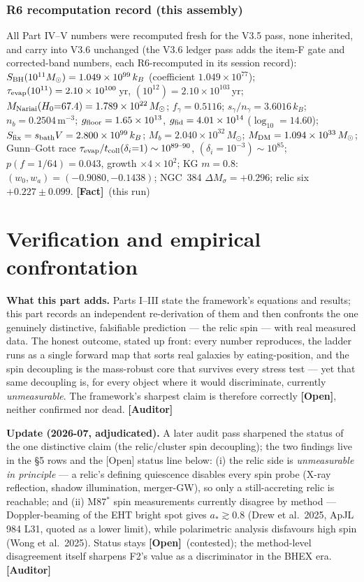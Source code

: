 \documentclass[11pt]{article}
\newcommand{\Fact}{\textbf{\textcolor{green!45!black}{[Fact]}}}
\newcommand{\Open}{\textbf{\textcolor{gray!10!black}{[Open]}}}
\newcommand{\Auditor}{\textbf{\textcolor{teal!55!black}{[Auditor]}}}
\newcommand{\open}{\textcolor{red!70!black}{\textbf{[Open]}}}
\begin{document}
\section{R6 recomputation record (this assembly)}
All Part IV--V numbers were recomputed fresh for the V3.5 pass, none inherited, and carry into V3.6 unchanged (the V3.6 ledger pass adds the item-F gate and corrected-band numbers, each R6-recomputed in its session record): $S_{\rm BH}(10^{11}M_\odot)=1.049\times10^{99}\,k_B$ (coefficient $1.049\times10^{77}$); $\tau_{\rm evap}(10^{11})=2.10\times10^{100}$\,yr, $(10^{12})=2.10\times10^{103}$\,yr; $M_{\rm Nariai}(H_0{=}67.4)=1.789\times10^{22}\,M_\odot$; $f_\gamma=0.5116$; $s_\gamma/n_\gamma=3.6016\,k_B$; $n_b=0.2504$\,m$^{-3}$; $g_{\rm floor}=1.65\times10^{13}$, $g_{\rm fid}=4.01\times10^{14}$ ($\log_{10}=14.60$); $S_{\rm fix}=s_{\rm bath}V=2.800\times10^{99}\,k_B$; $M_b=2.040\times10^{32}\,M_\odot$; $M_{\rm DM}=1.094\times10^{33}\,M_\odot$; Gunn--Gott race $\tau_{\rm evap}/t_{\rm coll}(\delta_i{=}1)\sim10^{89\text{--}90}$, $(\delta_i{=}10^{-3})\sim10^{85}$; $p(f{=}1/64)=0.043$, growth $\times4\times10^{2}$; KG $m{=}0.8$: $(w_0,w_a)=(-0.9080,-0.1438)$; NGC~384 $\Delta M_\sigma=+0.296$; relic six $+0.227\pm0.099$. \Fact\ (this run)

\clearpage

\part{Verification and empirical confrontation}
\setcounter{section}{0}\setcounter{equation}{0}\setcounter{figure}{0}

\noindent\textbf{What this part adds.} Parts I--III state the framework's equations and results; this part records an independent re-derivation of them and then confronts the one genuinely distinctive, falsifiable prediction --- the relic spin --- with real measured data. The honest outcome, stated up front: every number reproduces, the ladder runs as a single forward map that sorts real galaxies by eating-position, and the spin decoupling is the mass-robust core that survives every stress test --- yet that same decoupling is, for every object where it would discriminate, currently \emph{unmeasurable}. The framework's sharpest claim is therefore correctly \Open, neither confirmed nor dead. \Auditor

\noindent\textbf{Update (2026-07, adjudicated).} A later audit pass sharpened the status of the one distinctive claim (the relic/cluster spin decoupling); the two findings live in the \S5 rows and the [Open] status line below: (i) the relic side is \emph{unmeasurable in principle} --- a relic's defining quiescence disables every spin probe (X-ray reflection, shadow illumination, merger-GW), so only a still-accreting relic is reachable; and (ii) M87$^*$ spin measurements currently disagree by method --- Doppler-beaming of the EHT bright spot gives $a_*\gtrsim0.8$ (Drew et al.\ 2025, ApJL 984 L31, quoted as a lower limit), while polarimetric analysis disfavours high spin (Wong et al.\ 2025). Status stays \open\ (contested); the method-level disagreement itself sharpens F2's value as a discriminator in the BHEX era. \Auditor
\end{document}
